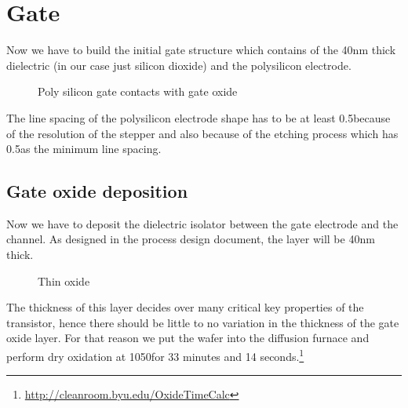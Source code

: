 \section{Gate}\label{gate_chapter}
Now we have to build the initial gate structure which contains of the 40nm thick dielectric (in our case just silicon dioxide) and the polysilicon electrode.

\begin{figure}[H]
	\centering
	\begin{tikzpicture}[node distance = 3cm, auto, thick,scale=\CrossAndTopSectionBig, every node/.style={transform shape}]
		
	\end{tikzpicture}
	\caption{Poly silicon gate contacts with gate oxide}
\end{figure}

The line spacing of the polysilicon electrode shape has to be at least 0.5\um because of the resolution of the stepper and also because of the etching process which has 0.5\um as the minimum line spacing.

\newpage

\subsection{Gate oxide deposition}\label{step_growing_gate_oxide}

Now we have to deposit the dielectric isolator between the gate electrode and the channel.
As designed in the process design document, the layer will be 40nm thick.

\begin{figure}[H]
	\centering
	\begin{tikzpicture}[node distance = 3cm, auto, thick,scale=\CrossSectionOnly, every node/.style={transform shape}]
		
	\end{tikzpicture}
	\begin{tikzpicture}[node distance = 3cm, auto, thick,scale=\CrossSectionOnly, every node/.style={transform shape}]
		
	\end{tikzpicture}
	\caption{Thin oxide}
\end{figure}
The thickness of this layer decides over many critical key properties of the transistor, hence there should be little to no variation in the thickness of the gate oxide layer.
For that reason we put the wafer into the diffusion furnace and perform dry oxidation at 1050\degreesC for 33 minutes and 14 seconds.\footnote{\url{http://cleanroom.byu.edu/OxideTimeCalc}}

